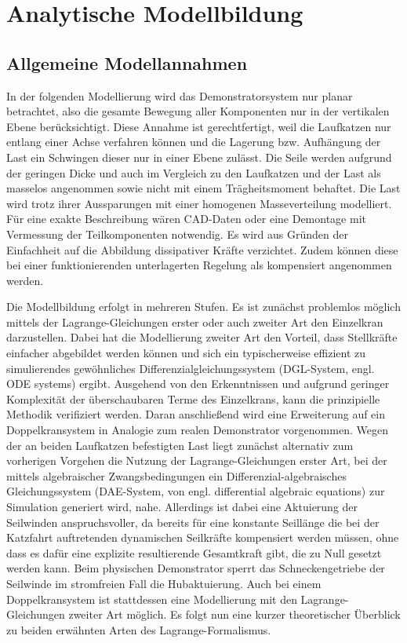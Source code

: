 \chapter{Analytische Modellbildung}

\section{Allgemeine Modellannahmen}

In der folgenden Modellierung wird das Demonstratorsystem nur planar betrachtet, also die gesamte Bewegung aller Komponenten nur in der vertikalen Ebene berücksichtigt. Diese Annahme ist gerechtfertigt, weil die Laufkatzen nur entlang einer Achse verfahren können und die Lagerung bzw. Aufhängung der Last ein Schwingen dieser nur in einer Ebene zulässt. Die Seile werden aufgrund der geringen Dicke und auch im Vergleich zu den Laufkatzen und der Last als masselos angenommen sowie nicht mit einem Trägheitsmoment behaftet. Die Last wird trotz ihrer Aussparungen mit einer homogenen Masseverteilung modelliert. Für eine exakte Beschreibung wären CAD-Daten oder eine Demontage mit Vermessung der Teilkomponenten notwendig. Es wird aus Gründen der Einfachheit auf die Abbildung dissipativer Kräfte verzichtet. Zudem können diese bei einer funktionierenden unterlagerten Regelung als kompensiert angenommen werden.

Die Modellbildung erfolgt in mehreren Stufen. Es ist zunächst problemlos möglich mittels der Lagrange-Gleichungen erster oder auch zweiter Art den Einzelkran darzustellen. Dabei hat die Modellierung zweiter Art den Vorteil, dass Stellkräfte einfacher abgebildet werden können und sich ein typischerweise effizient zu simulierendes gewöhnliches Differenzialgleichungssystem (DGL-System, engl. ODE systems) ergibt. Ausgehend von den Erkenntnissen und aufgrund geringer Komplexität der überschaubaren Terme des Einzelkrans, kann die prinzipielle Methodik verifiziert werden. Daran anschließend wird eine Erweiterung auf ein Doppelkransystem in Analogie zum realen Demonstrator vorgenommen. Wegen der an beiden Laufkatzen befestigten Last liegt zunächst alternativ zum vorherigen Vorgehen die Nutzung der Lagrange-Gleichungen erster Art, bei der mittels algebraischer Zwangsbedingungen ein Differenzial-algebraisches Gleichungssystem (DAE-System, von engl. differential algebraic equations) zur Simulation generiert wird, nahe. Allerdings ist dabei eine Aktuierung der Seilwinden anspruchsvoller, da bereits für eine konstante Seillänge die bei der Katzfahrt auftretenden dynamischen Seilkräfte kompensiert werden müssen, ohne dass es dafür eine explizite resultierende Gesamtkraft gibt, die zu Null gesetzt werden kann. Beim physischen Demonstrator sperrt das Schneckengetriebe der Seilwinde im stromfreien Fall die Hubaktuierung. Auch bei einem Doppelkransystem ist stattdessen eine Modellierung mit den Lagrange-Gleichungen zweiter Art möglich. Es folgt nun eine kurzer theoretischer Überblick zu beiden erwähnten Arten des Lagrange-Formalismus.

